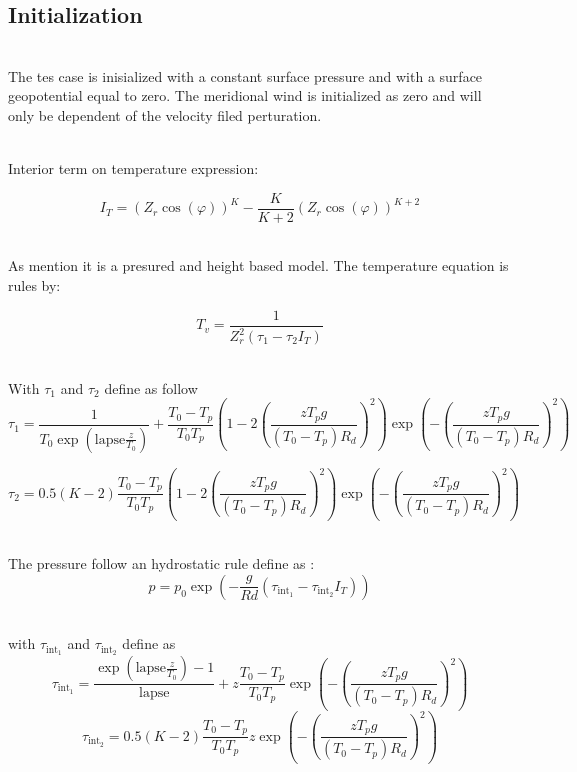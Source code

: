 \documentclass[times,doublespace]{fldauth}
\begin{document}
\clearpage
\subsection{ Initialization }
 ~\\ The tes case is inisialized with a constant surface pressure and with a surface geopotential equal to zero. The meridional wind is initialized as zero and will only be dependent of the velocity filed perturation. 

~\\Interior term on temperature expression:

\begin{equation*}
I_{T}=(Z_r\cos(\varphi))^K-\frac{K}{K+2}(Z_r\cos(\varphi))^{K+2}
\end{equation*}

~\\ As mention it is a presured and height based model.  The temperature equation is rules by:



\begin{equation*}
T_v=\frac{1}{Z_r^2(\tau_1-\tau_2 I_T)} 
\label{virtTemp}
\end{equation*}


~\\ With $\tau_1$ and $\tau_2$ define as follow
\begin{equation*}
\tau_1=\frac{1}{T_0\exp\left(\text{lapse}\frac{z}{T_0}\right)} + \frac{T_0-T_p}{T_0T_p}\left(1-2\left(\frac{zT_pg}{(T_0-T_p)R_d}\right)^2\right)\exp\left(-\left(\frac{zT_pg}{(T_0-T_p)R_d}\right)^2\right)
\end{equation*}



\begin{equation*}
\tau_2=0.5(K-2)\frac{T_0-T_p}{T_0T_p}\left(1-2\left(\frac{zT_pg}{(T_0-T_p)R_d}\right)^2\right)\exp\left(-\left(\frac{zT_pg}{(T_0-T_p)R_d}\right)^2\right)
\end{equation*}


~\\ The pressure follow an hydrostatic rule define as :
\begin{equation}
p=p_0\exp(-\frac{g}{Rd}(\tau_{\text{int}_1}-\tau_{\text{int}_2}I_T))
\end{equation}

~\\with $\tau_{\text{int}_1}$ and $\tau_{\text{int}_2}$ define as
\begin{equation*}
\tau_{\text{int}_1}=\frac{\exp\left( \text{lapse}\frac{z}{T_0} \right)-1}{\text{lapse}}+z\frac{T_0-T_p}{T_0T_p}\exp\left(-\left(\frac{zT_pg}{(T_0-T_p)R_d}\right)^2\right)
\end{equation*}
\begin{equation*}
\tau_{\text{int}_2}=0.5(K-2)\frac{T_0-T_p}{T_0T_p}z\exp\left(-\left(\frac{zT_pg}{(T_0-T_p)R_d}\right)^2\right)
\end{equation*}
\end{document}
